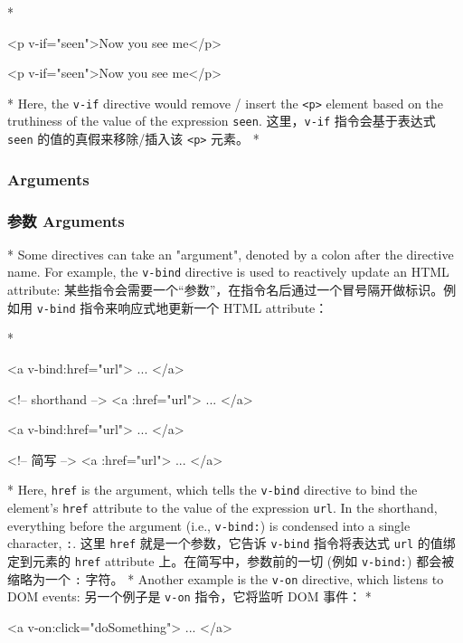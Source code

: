 \begin{paracol}{2}
\switchcolumn[0]*%
\begin{codeHtml}
<p v-if="seen">Now you see me</p>
\end{codeHtml}  
\switchcolumn
\begin{codeHtml}
<p v-if="seen">Now you see me</p>
\end{codeHtml}  
\switchcolumn[0]*%
Here, the \texttt{v-if} directive would remove / insert the
\texttt{\textless{}p\textgreater{}} element based on the truthiness of
the value of the expression \texttt{seen}.
\switchcolumn
这里，\texttt{v-if} 指令会基于表达式 \texttt{seen}
的值的真假来移除/插入该 \texttt{\textless{}p\textgreater{}} 元素。
\switchcolumn[0]*%
\subsubsection{Arguments}
\switchcolumn
\subsubsection{参数 Arguments}
\switchcolumn[0]*%
Some directives can take an "argument", denoted by a colon after the
directive name. For example, the \texttt{v-bind} directive is used to
reactively update an HTML attribute:
\switchcolumn
某些指令会需要一个``参数''，在指令名后通过一个冒号隔开做标识。例如用
\texttt{v-bind} 指令来响应式地更新一个 HTML attribute：

\switchcolumn[0]*%
\begin{codeHtml}
<a v-bind:href="url"> ... </a>

<!-- shorthand -->
<a :href="url"> ... </a>
\end{codeHtml}  
\switchcolumn
\begin{codeHtml}
<a v-bind:href="url"> ... </a>

<!-- 简写 -->
<a :href="url"> ... </a>
\end{codeHtml}  

\switchcolumn[0]*%
Here, \texttt{href} is the argument, which tells the \texttt{v-bind}
directive to bind the element's \texttt{href} attribute to the value of
the expression \texttt{url}. In the shorthand, everything before the
argument (i.e., \texttt{v-bind:}) is condensed into a single character,
\texttt{:}.
\switchcolumn
这里 \texttt{href} 就是一个参数，它告诉 \texttt{v-bind} 指令将表达式
\texttt{url} 的值绑定到元素的 \texttt{href} attribute
上。在简写中，参数前的一切 (例如 \texttt{v-bind:}) 都会被缩略为一个
\texttt{:} 字符。
\switchcolumn[0]*%
Another example is the \texttt{v-on} directive, which listens to DOM
events:
\switchcolumn
另一个例子是 \texttt{v-on} 指令，它将监听 DOM 事件：
\switchcolumn[0]*%
\begin{codeHtml}
<a v-on:click="doSomething"> ... </a>


\end{codeHtml}
\end{paracol}
